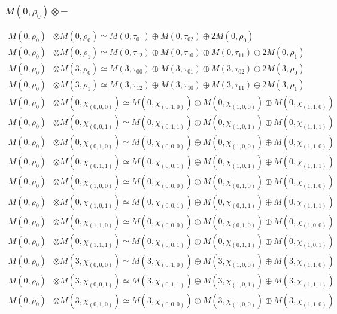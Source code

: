 \subsubsection{$ M(0,\rho_{0})\otimes -$}
\begin{align*}
M(0,\rho_{0}) &\otimes M(0,\rho_{0}) \simeq M(0,\tau_{01}) \oplus M(0,\tau_{02}) \oplus 2 M(0,\rho_{0}) \\
M(0,\rho_{0}) &\otimes M(0,\rho_{1}) \simeq M(0,\tau_{12}) \oplus M(0,\tau_{10}) \oplus M(0,\tau_{11}) \oplus 2 M(0,\rho_{1}) \\
M(0,\rho_{0}) &\otimes M(3,\rho_{0}) \simeq M(3,\tau_{00}) \oplus M(3,\tau_{01}) \oplus M(3,\tau_{02}) \oplus 2 M(3,\rho_{0}) \\
M(0,\rho_{0}) &\otimes M(3,\rho_{1}) \simeq M(3,\tau_{12}) \oplus M(3,\tau_{10}) \oplus M(3,\tau_{11}) \oplus 2 M(3,\rho_{1}) \\
M(0,\rho_{0}) &\otimes M(0,\chi_{(0,0,0)}) \simeq M(0,\chi_{(0,1,0)}) \oplus M(0,\chi_{(1,0,0)}) \oplus M(0,\chi_{(1,1,0)}) \\
M(0,\rho_{0}) &\otimes M(0,\chi_{(0,0,1)}) \simeq M(0,\chi_{(0,1,1)}) \oplus M(0,\chi_{(1,0,1)}) \oplus M(0,\chi_{(1,1,1)}) \\
M(0,\rho_{0}) &\otimes M(0,\chi_{(0,1,0)}) \simeq M(0,\chi_{(0,0,0)}) \oplus M(0,\chi_{(1,0,0)}) \oplus M(0,\chi_{(1,1,0)}) \\
M(0,\rho_{0}) &\otimes M(0,\chi_{(0,1,1)}) \simeq M(0,\chi_{(0,0,1)}) \oplus M(0,\chi_{(1,0,1)}) \oplus M(0,\chi_{(1,1,1)}) \\
M(0,\rho_{0}) &\otimes M(0,\chi_{(1,0,0)}) \simeq M(0,\chi_{(0,0,0)}) \oplus M(0,\chi_{(0,1,0)}) \oplus M(0,\chi_{(1,1,0)}) \\
M(0,\rho_{0}) &\otimes M(0,\chi_{(1,0,1)}) \simeq M(0,\chi_{(0,0,1)}) \oplus M(0,\chi_{(0,1,1)}) \oplus M(0,\chi_{(1,1,1)}) \\
M(0,\rho_{0}) &\otimes M(0,\chi_{(1,1,0)}) \simeq M(0,\chi_{(0,0,0)}) \oplus M(0,\chi_{(0,1,0)}) \oplus M(0,\chi_{(1,0,0)}) \\
M(0,\rho_{0}) &\otimes M(0,\chi_{(1,1,1)}) \simeq M(0,\chi_{(0,0,1)}) \oplus M(0,\chi_{(0,1,1)}) \oplus M(0,\chi_{(1,0,1)}) \\
M(0,\rho_{0}) &\otimes M(3,\chi_{(0,0,0)}) \simeq M(3,\chi_{(0,1,0)}) \oplus M(3,\chi_{(1,0,0)}) \oplus M(3,\chi_{(1,1,0)}) \\
M(0,\rho_{0}) &\otimes M(3,\chi_{(0,0,1)}) \simeq M(3,\chi_{(0,1,1)}) \oplus M(3,\chi_{(1,0,1)}) \oplus M(3,\chi_{(1,1,1)}) \\
M(0,\rho_{0}) &\otimes M(3,\chi_{(0,1,0)}) \simeq M(3,\chi_{(0,0,0)}) \oplus M(3,\chi_{(1,0,0)}) \oplus M(3,\chi_{(1,1,0)}) \\

\end{align*}
